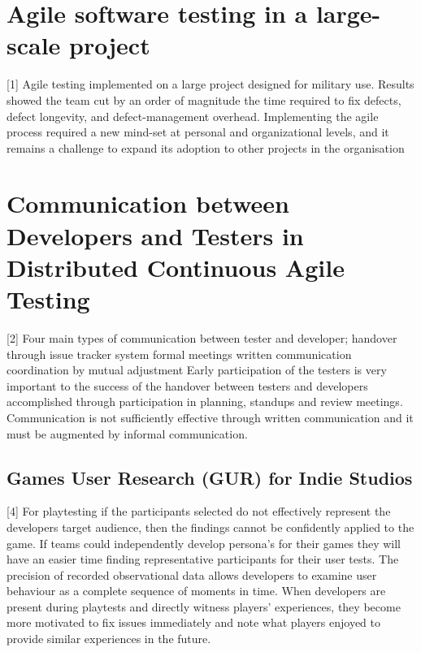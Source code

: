 \documentclass{beamer}
\begin{document}
	\small
	\begin{frame}
	
	\section{Agile software testing in a large-scale project}
	
	[1] Agile testing implemented on a large project designed for military use. Results showed the team cut by an order of magnitude the time required to fix defects, defect longevity, and defect-management overhead. Implementing the agile process required a new mind-set at personal and organizational levels, and it remains a challenge to expand its adoption to other projects in the organisation
	
	\section{Communication between Developers and Testers in Distributed Continuous Agile Testing}
	
	[2] Four main types of communication between tester and developer;
	handover through issue tracker system
	formal meetings
	written communication 
	coordination by mutual adjustment
	Early participation of the testers is very important to the success of the handover between testers and developers accomplished through participation in planning, standups and review meetings. Communication is not sufficiently effective through written communication and it must be augmented by informal communication.	
	\end{frame}
	\begin{frame}

	\section{Games User Research (GUR) for Indie Studios }
	
	[4] For playtesting if the participants selected do not effectively represent the developers target audience, then the findings cannot be confidently applied to the game. If teams could independently develop persona's for their games they will have an easier time finding representative participants for their user tests. The precision of recorded observational data allows developers to examine user behaviour as a complete sequence of moments in time. When developers are present during playtests and directly witness players' experiences, they become more motivated to fix issues immediately and note what players enjoyed to provide similar experiences in the future.
	\end{frame}
\end{document}
